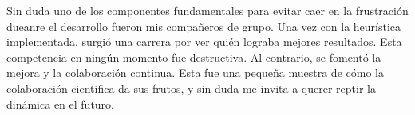 \documentclass[9pt,a4paper,twocolumn,twoside]{tau-class/tau}
\begin{document}
    Sin duda uno de los componentes fundamentales para evitar caer en la frustración dueanre el desarrollo fueron mis compañeros de grupo. Una vez con la heurística implementada, surgió una carrera por ver quién lograba mejores resultados. Esta competencia en ningún momento fue destructiva. Al contrario, se fomentó la mejora y la colaboración continua. Esta fue una pequeña muestra de cómo la colaboración científica da sus frutos, y sin duda me invita a querer reptir la dinámica en el futuro.


\printbibliography

\end{document}
